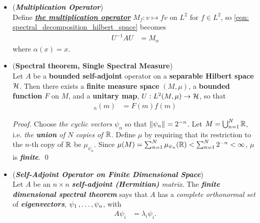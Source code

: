 \documentclass[11pt]{article}
\begin{document}
\begin{itemize}
\item \begin{remark} (\textbf{\emph{Multiplication Operator}}) \\
Define \underline{\emph{\textbf{the multiplication operator}}} $M_f: v \mapsto f v$ on $L^2$ for $f \in L^2$, so \eqref{eqn: spectral_decomposition_hilbert_space} becomes
\begin{align}
U^{-1} A U  &= M_{\alpha} \label{eqn: spectral_decomposition_hilbert_space_multiplication_operator}
\end{align} where $\alpha(x) = x$.
\end{remark}

\item \begin{corollary} (\textbf{Spectral theorem, Single Spectral Measure})   \citep{reed1980methods}\\
Let $A$ be a \textbf{bounded self-adjoint} operator on a \textbf{separable Hilbert space} ${\mathcal H}$. Then there exists a \textbf{finite measure space} $(M, \mu)$, a \textbf{bounded  function} $F$ on $M$, and a \textbf{unitary map}, $U:  L^2(M, \mu) \rightarrow {\mathcal H}$, so that 
\begin{align*}
[U^{-1} A U f]_n(m) &= F(m)  f(m)
\end{align*} 
\end{corollary}
\begin{proof}
Choose \emph{the cyclic vectors} $\psi_n$ so that $\left\|\psi_n\right\|_{} = 2^{-n}$. Let $M = \bigcup_{n=1}^{N}{\mathbb R}$, 
i.e. \emph{the \textbf{union} of $Ν$ copies of ${\mathbb R}$}. Define $\mu$ by requiring that its restriction to the $n$-th copy of ${\mathbb R}$ be $\mu_{\psi_n}$. Since $\mu(M) = \sum_{n=1}^{N}\mu_{\psi_n}({\mathbb R}) < \sum_{n=1}^{N}2^{-n} < \infty$, $\mu$ is \textbf{\emph{finite}}. \qed
\end{proof}


\item \begin{example} (\emph{\textbf{Self-Adjoint Operator on Finite Dimensional Space}})\\
Let $A$ be an $n \times n$ \emph{\textbf{self-adjoint (Hermitian)} matrix}. The \emph{\textbf{finite dimensional spectral theorem}} says that $A$ has a \emph{complete orthonormal set} of \emph{\textbf{eigenvectors}}, $\psi_1 \,{,}\ldots{,}\, \psi_n$, with
\begin{align*}
A \psi_i &= \lambda_i \psi_i.
\end{align*}


\end{example}
\end{itemize}
\end{document}
